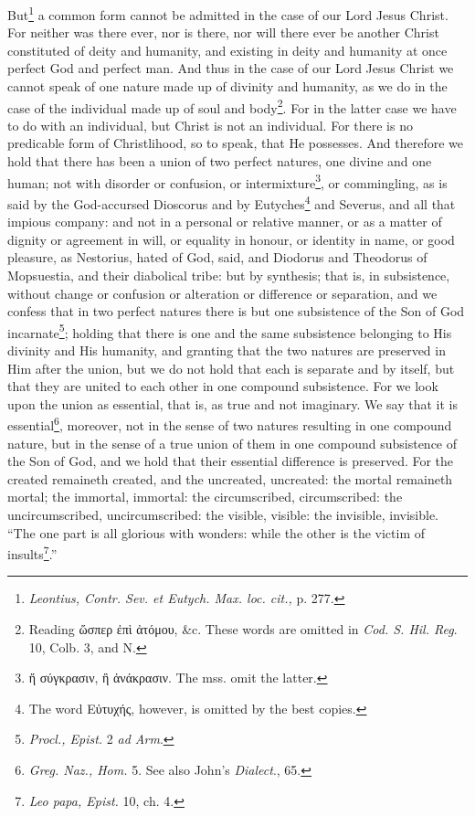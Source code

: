 But\footnote{\emph{Leontius, Contr. Sev. et Eutych. Max. loc. cit., }p. 277.} a common form cannot be admitted in the case of our Lord Jesus Christ. For neither was there ever, nor is there, nor will there ever be another Christ constituted of deity and humanity, and existing in deity and humanity at once perfect God and perfect man. And thus in the case of our Lord Jesus Christ we cannot speak of one nature made up of divinity and humanity, as we do in the case of the individual made up of soul and body\footnote{Reading \textgreek{ὥσπερ ἐπὶ ἀτόμου}, \&c. These words are omitted in \emph{Cod. S. Hil. Reg}. 10, Colb. 3, and N.}. For in the latter case we have to do with an individual, but Christ is not an individual. For there is no predicable form of Christlihood, so to speak, that He possesses. And therefore we hold that there has been a union of two perfect natures, one divine and one human; not with disorder or confusion, or intermixture\footnote{\textgreek{ἤ σύγκρασιν, ἢ ἀνάκρασιν}. The mss. omit the latter.}, or commingling, as is said by the God-accursed Dioscorus and by Eutyches\footnote{The word \textgreek{Εὐτυχής}, however, is omitted by the best copies.} and Severus, and all that impious company: and not in a personal or relative manner, or as a matter of dignity or agreement in will, or equality in honour, or identity in name, or good pleasure, as Nestorius, hated of God, said, and Diodorus and Theodorus of Mopsuestia, and their diabolical tribe: but by synthesis; that is, in subsistence, without change or confusion or alteration or difference or separation, and we confess that in two perfect natures there is but one subsistence of the Son of God incarnate\footnote{\emph{Procl., Epist. }2 \emph{ad Arm}.}; holding that there is one and the same subsistence belonging to His divinity and His humanity, and granting that the two natures are preserved in Him after the union, but we do not hold that each is separate and by itself, but that they are united to each other in one compound subsistence. For we look upon the union as essential, that is, as true and not imaginary. We say that it is essential\footnote{\emph{Greg. Naz., Hom. }5. See also John’s \emph{Dialect}., 65.}, moreover, not in the sense of two natures resulting in one compound nature, but in the sense of a true union of them in one compound subsistence of the Son of God, and we hold that their essential difference is preserved. For the created remaineth created, and the uncreated, uncreated: the mortal remaineth mortal; the immortal, immortal: the circumscribed, circumscribed: the uncircumscribed, uncircumscribed: the visible, visible: the invisible, invisible. “The one part is all glorious with wonders: while the other is the victim of insults\footnote{\emph{Leo papa, Epist. }10, ch. 4.}.”

